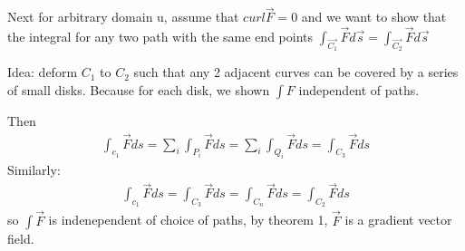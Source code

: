 \documentclass{article}
\begin{document}
        Next for arbitrary domain u, assume that $curl\vec{F} = 0$ and we want to show that the integral for any two path with the same end points $\int_{\vec{C_1}}\vec{F}d\vec{s} = \int_{\vec{C_2}}\vec{F}d\vec{s}$
        
        Idea: deform $C_1$ to $C_2$ such that any 2 adjacent curves can be covered by a series of small disks. Because for each disk, we shown $\int F$ independent of paths.
        
        Then
        \begin{align}
            \int_{c_1}\vec{F}ds = \sum_i \int_{P_i}\vec{F}ds = \sum_i \int_{Q_i}\vec{F}ds =  \int_{C_3}\vec{F}ds
        \end{align}
        Similarly: 
        \begin{align}
            \int_{c_1}\vec{F}ds = \int_{C_3}\vec{F}ds = \int_{C_n}\vec{F}ds =  \int_{C_2}\vec{F}ds
        \end{align}
        so $\int\vec{F}$ is indenependent of choice of paths, by theorem 1, $\vec{F}$ is a gradient vector field.
        
\end{document}
